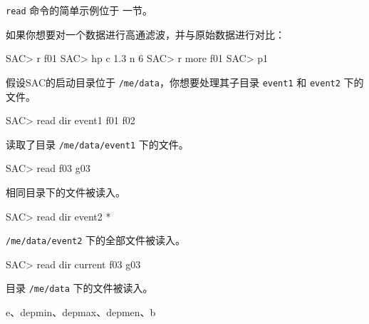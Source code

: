 \texttt{read} 命令的简单示例位于 一节。

如果你想要对一个数据进行高通滤波，并与原始数据进行对比：
\begin{SACCode}
SAC> r f01
SAC> hp c 1.3 n 6
SAC> r more f01
SAC> p1
\end{SACCode}

假设SAC的启动目录位于 \texttt{/me/data}，你想要处理其子目录 \texttt{event1}
和 \texttt{event2} 下的文件。
\begin{SACCode}
SAC> read dir event1 f01 f02
\end{SACCode}
读取了目录 \texttt{/me/data/event1} 下的文件。

\begin{SACCode}
SAC> read f03 g03
\end{SACCode}
相同目录下的文件被读入。

\begin{SACCode}
SAC> read dir event2 *
\end{SACCode}
\texttt{/me/data/event2} 下的全部文件被读入。

\begin{SACCode}
SAC> read dir current f03 g03
\end{SACCode}
目录 \texttt{/me/data} 下的文件被读入。

e、depmin、depmax、depmen、b
